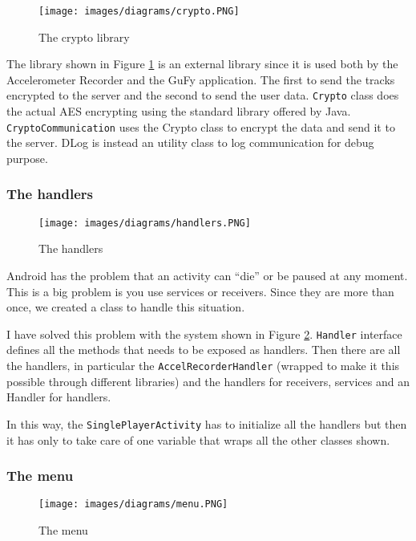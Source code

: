 \begin{figure}[H]
\centering %
\texttt{[image: images/diagrams/crypto.PNG]}
\caption{The crypto library}
\label{fig:cryptoLibrary}
\end{figure}

The library shown in Figure \ref{fig:cryptoLibrary} is an external library since it is used both by the Accelerometer Recorder and the GuFy application. The first to send the tracks encrypted to the server and the second to send the user data. \texttt{Crypto} class does the actual AES encrypting using the standard library offered by Java. \texttt{CryptoCommunication} uses the Crypto class to encrypt the data and send it to the server. DLog is instead an utility class to log communication for debug purpose.

\subsubsection{The handlers}

\begin{figure}[H]
\centering %
\texttt{[image: images/diagrams/handlers.PNG]}
\caption{The handlers}
\label{fig:handlers}
\end{figure}

Android has the problem that an activity can ``die'' or be paused at any moment. This is a big problem is you use services or receivers. Since they are more than once, we created a class to handle this situation.

I have solved this problem with the system shown in Figure \ref{fig:handlers}. \texttt{Handler} interface defines all the methods that needs to be exposed as handlers. Then there are all the handlers, in particular the \texttt{AccelRecorderHandler} (wrapped to make it this possible through different libraries)  and the handlers for receivers, services and an Handler for handlers.

In this way, the \texttt{SinglePlayerActivity} has to initialize all the handlers but then it has only to take care of one variable that wraps all the other classes shown.

\subsubsection{The menu}

\begin{figure}[H]
\centering %
\texttt{[image: images/diagrams/menu.PNG]}
\caption{The menu}
\label{fig:menu}
\end{figure}

